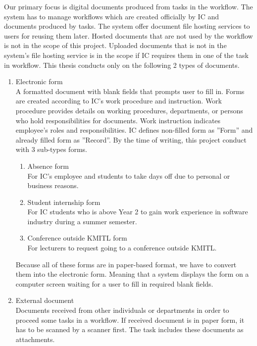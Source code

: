 Our primary focus is digital documents produced from tasks in the workflow.
The system has to manage workflows which are created officially by IC and documents produced by tasks.
The system offer document file hosting services to users for reusing them later.
Hosted documents that are not used by the workflow is not in the scope of this project.
Uploaded documents that is not in the system's file hosting service is in the scope if IC requires them in one of the task in workflow.
This thesis conducts only on the following 2 types of documents.
\begin{enumerate}
\item Electronic form \hfill \\
A formatted document with blank fields that prompts user to fill in.
Forms are created according to IC's work procedure and instruction.
Work procedure provides details on working procedures, departments, or persons who hold responsibilities for documents.
Work instruction indicates employee's roles and responsibilities.
IC defines non-filled form as ''Form'' and already filled form as ''Record''.
By the time of writing, this project conduct with 3 sub-types forms.
\begin{enumerate}
\item Absence form \hfill \\
For IC's employee and students to take days off due to personal or business reasons.
\item Student internship form \hfill \\
For IC students who is above Year 2 to gain work experience in software industry during a summer semester.
\item Conference outside KMITL form \hfill \\
For lecturers to request going to a conference outside KMITL.
\end{enumerate}
Because all of these forms are in paper-based format, we have to convert them into the electronic form.
Meaning that a system displays the form on a computer screen waiting for a user to fill in required blank fields.
\item External document \hfill \\
Documents received from other individuals or departments in order to proceed some tasks in a workflow.
If received document is in paper form, it has to be scanned by a scanner first.
The task includes these documents as attachments.
\end{enumerate}

